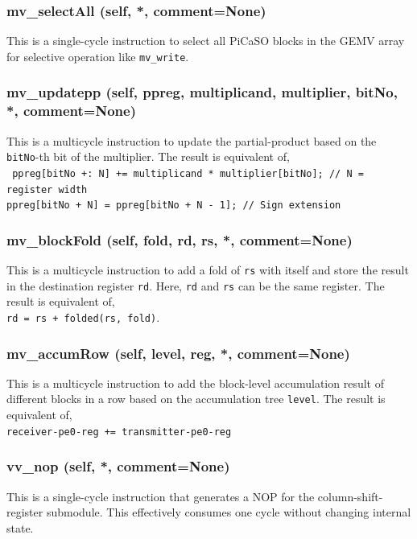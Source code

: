 \documentclass{article}
\begin{document}
\subsubsection*{mv\_selectAll (self, *, comment=None)}
This is a single-cycle instruction to select all PiCaSO blocks in the GEMV
array for selective operation like \texttt{mv\_write}.


\subsubsection*{mv\_updatepp (self, ppreg, multiplicand, multiplier, bitNo, *, comment=None)}
This is a multicycle instruction to update the partial-product based on the
\texttt{bitNo}-th bit of the multiplier.
The result is equivalent of, \\
\texttt{
\hspace*{1cm} ppreg[bitNo +: N] += multiplicand * multiplier[bitNo]; // N = register width \\
\hspace*{1cm} ppreg[bitNo + N] = ppreg[bitNo + N - 1]; // Sign extension
}


\subsubsection*{mv\_blockFold (self, fold, rd, rs, *, comment=None)}
This is a multicycle instruction to add a fold of \texttt{rs} with itself
and store the result in the destination register \texttt{rd}.
Here, \texttt{rd} and \texttt{rs} can be the same register.
The result is equivalent of, \\
\hspace*{1cm} \texttt{rd = rs + folded(rs, fold)}.


\subsubsection*{mv\_accumRow (self, level, reg, *, comment=None)}
This is a multicycle instruction to add the block-level accumulation result
of different blocks in a row based on the accumulation tree \texttt{level}.
The result is equivalent of, \\
\hspace*{1cm} \texttt{receiver-pe0-reg += transmitter-pe0-reg}


\subsubsection*{vv\_nop (self, *, comment=None)}
This is a single-cycle instruction that generates a NOP for the
column-shift-register submodule.
This effectively consumes one cycle without changing internal state.
\end{document}

